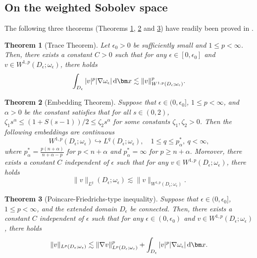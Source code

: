 \documentclass[3p,times]{elsarticle}
\newtheorem{theorem}{Theorem}[section]
\numberwithin{equation}{section}
\newcommand{\dd}{\,{\rm d}}
\begin{document}
\subsection{On the weighted Sobolev space}

The following three theorems (Theorems \ref{trace_thm}, \ref{embed_thm} and \ref{Poincare_thm})
have readily been proved in \cite{BurgerElvetun2017}.
\begin{theorem}[Trace Theorem]
	\label{trace_thm}
	Let $\epsilon_0>0$ be sufficiently small and $1\leq p < \infty$. Then, there exists a constant $C>0$ such that for any $\epsilon \in [0, \epsilon_0]$ and $v \in W^{1,p}(D_{\epsilon};\omega_{\epsilon})$, there holds
	\begin{equation*}
		\int_{D_{\epsilon}} |v|^p|\nabla \omega_{\epsilon}|\dd \bm x \lesssim \|v\|_{W^{1,p}(D_{\epsilon};\omega_{\epsilon})}^p.
	\end{equation*}
\end{theorem}

\begin{theorem}[Embedding Theorem]\label{embed_thm}
	Suppose that $\epsilon \in (0, \epsilon_0]$, $1\leq p < \infty$, and $\alpha>0$ be the constant satisfies that for all $s \in (0, 2)$, $\zeta_1 s^{\alpha}\leq (1+S(s-1))/2\leq \zeta_2 s^{\alpha}$ for some constants $\zeta_1,\zeta_2>0$. Then the following embeddings are continuous
	\begin{equation*}
		W^{1,p}(D_{\epsilon};\omega_{\epsilon}) \hookrightarrow L^q(D_{\epsilon};\omega_{\epsilon}), \quad 1 \leq q \leq p_{\alpha}^*, \ q < \infty,
	\end{equation*}
	where
	$	p_{\alpha}^*=\frac{p(n+\alpha)}{n+\alpha-p}$ for $p < n+\alpha$ and  $p_{\alpha}^*=\infty$ for $p \geq n+\alpha.$
	Moreover, there exists a constant $C$ independent of $\epsilon$ such that for any $v \in W^{1,p}(D_{\epsilon};\omega_{\epsilon})$, there holds
	\begin{equation*}
		\|v\|_{L^q}(D_{\epsilon};\omega_{\epsilon}) \lesssim \|v\|_{W^{1,p}(D_{\epsilon};\omega_{\epsilon})}.
	\end{equation*}
\end{theorem}

\begin{theorem}[Poincare-Friedrichs-type inequality]\label{Poincare_thm}
	Suppose that $\epsilon \in (0,\epsilon_0]$, $1\leq p<\infty$, and  the extended domain $D_{\epsilon}$ be connected. Then, there exists a constant $C$ independent of $\epsilon$ such that for any $\epsilon \in (0,\epsilon_0)$ and $v \in W^{1,p}(D_{\epsilon};\omega_{\epsilon})$, there holds
	\begin{equation*}
		\|v\|_{L^p(D_{\epsilon};\omega_{\epsilon})} \lesssim \|\nabla v\|_{L^p(D_{\epsilon};\omega_{\epsilon})}^p + \int_{D_{\epsilon}}|v|^p|\nabla \omega_{\epsilon}|\dd \bm x.
	\end{equation*}
	
\end{theorem}
\end{document}
